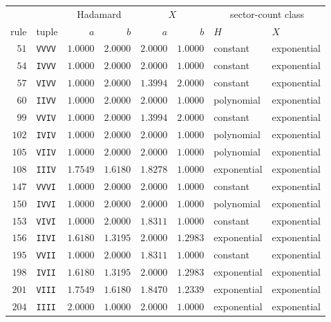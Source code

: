 \begin{tabular}{rlrrrrll}
\hline
 & & \multicolumn{2}{c}{Hadamard} & \multicolumn{2}{c}{$X$} & \multicolumn{2}{c}{sector-count class} \\
rule & tuple & $a$ & $b$ & $a$ & $b$ & $H$ & $X$ \\
\hline
$51$ & \texttt{VVVV} & $1.0000$ & $2.0000$ & $2.0000$ & $1.0000$ & constant & exponential \\
$54$ & \texttt{IVVV} & $1.0000$ & $2.0000$ & $2.0000$ & $1.0000$ & constant & exponential \\
$57$ & \texttt{VIVV} & $1.0000$ & $2.0000$ & $1.3994$ & $2.0000$ & constant & exponential \\
$60$ & \texttt{IIVV} & $1.0000$ & $2.0000$ & $2.0000$ & $1.0000$ & polynomial & exponential \\
$99$ & \texttt{VVIV} & $1.0000$ & $2.0000$ & $1.3994$ & $2.0000$ & constant & exponential \\
$102$ & \texttt{IVIV} & $1.0000$ & $2.0000$ & $2.0000$ & $1.0000$ & polynomial & exponential \\
$105$ & \texttt{VIIV} & $1.0000$ & $2.0000$ & $2.0000$ & $1.0000$ & polynomial & exponential \\
$108$ & \texttt{IIIV} & $1.7549$ & $1.6180$ & $1.8278$ & $1.0000$ & exponential & exponential \\
$147$ & \texttt{VVVI} & $1.0000$ & $2.0000$ & $2.0000$ & $1.0000$ & constant & exponential \\
$150$ & \texttt{IVVI} & $1.0000$ & $2.0000$ & $2.0000$ & $1.0000$ & polynomial & exponential \\
$153$ & \texttt{VIVI} & $1.0000$ & $2.0000$ & $1.8311$ & $1.0000$ & constant & exponential \\
$156$ & \texttt{IIVI} & $1.6180$ & $1.3195$ & $2.0000$ & $1.2983$ & exponential & exponential \\
$195$ & \texttt{VVII} & $1.0000$ & $2.0000$ & $1.8311$ & $1.0000$ & constant & exponential \\
$198$ & \texttt{IVII} & $1.6180$ & $1.3195$ & $2.0000$ & $1.2983$ & exponential & exponential \\
$201$ & \texttt{VIII} & $1.7549$ & $1.6180$ & $1.8470$ & $1.2339$ & exponential & exponential \\
$204$ & \texttt{IIII} & $2.0000$ & $1.0000$ & $2.0000$ & $1.0000$ & exponential & exponential \\
\hline
\end{tabular}
